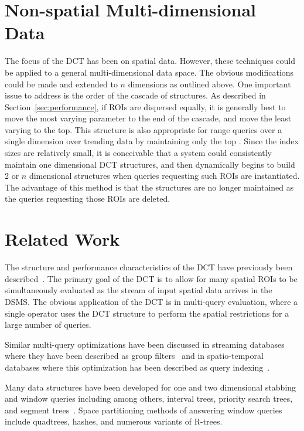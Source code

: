 \documentclass{ucdthesis}       %
\begin{document}
\section{Non-spatial Multi-dimensional Data}
%
The focus of the \ac{DCT} has been on spatial data.  However, these
techniques could be applied to a general multi-dimensional data space.
The obvious modifications could be made and extended to $n$ dimensions
as outlined above.  One important issue to address is the order of the
cascade of  structures.  As described in
Section~\ref{sec:performance}, if \acp{ROI} are dispersed equally, it is
generally best to move the most varying parameter to the end of the
cascade, and move the least varying to the top.  This structure is
also appropriate for range queries over a single dimension over
trending data by maintaining only the top .  Since the index
sizes are relatively small, it is conceivable that a system could
consistently maintain one dimensional \ac{DCT} structures, and then
dynamically begins to build 2 or $n$ dimensional structures when
queries requesting such \acp{ROI} are instantiated.  The advantage of
this method is that the structures are no longer maintained as the
queries requesting those \acp{ROI} are deleted.

\section{Related Work}
\label{sec:related}

The structure and performance characteristics of the \ac{DCT} have
previously been
described~\cite{hart04index-query,DBLP:conf/ssd/HartGZ05}.  The
primary goal of the \ac{DCT} is to allow for many spatial \acp{ROI} to
be simultaneously evaluated as the stream of input spatial data
arrives in the \ac{DSMS}.  The obvious application of the \ac{DCT} is
in multi-query evaluation, where a single operator uses the \ac{DCT}
structure to perform the spatial restrictions for a large number of
queries.

Similar multi-query optimizations have been discussed in streaming
databases where they have been described as group
filters~\cite{madden02fjord-stream, madden02contin-adapt} and in
spatio-temporal databases where this optimization has been described
as query indexing~\cite{prabhakar02qindex}.

Many data structures have been developed for one and two dimensional
stabbing and window queries including among others, interval trees,
priority search trees, and segment trees~\cite{berg00comput-geomet}.
Space partitioning methods of answering window queries include
quadtrees, hashes, and numerous variants of R-trees.
\end{document}
